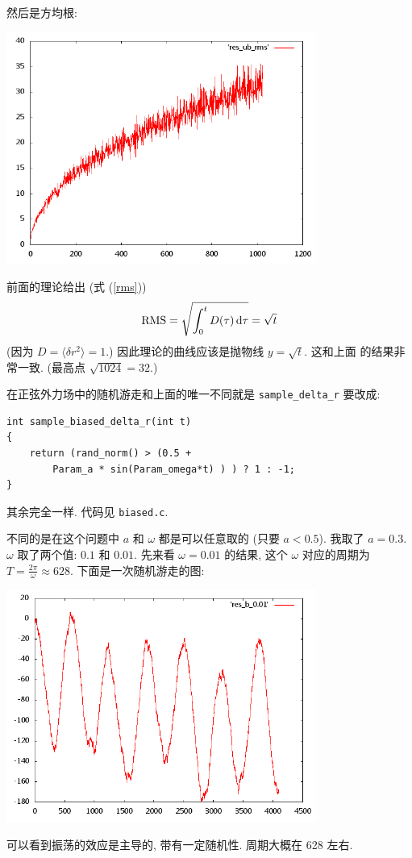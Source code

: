 \documentclass{ctexart}
\def\dd{{\rm d}}
\begin{document}
然后是方均根:
\begin{center}
\includegraphics[width=4in]{plot_ub_rms.png}
\end{center}
前面的理论给出 (式 (\ref{rms}))
\[
{\rm RMS} = \sqrt{\int^t_0 D(\tau)\,\dd\tau}
= \sqrt{t}
\]
(因为 $D = \langle \delta r^2\rangle = 1$.)
因此理论的曲线应该是抛物线 $y=\sqrt{t}$. 这和上面
的结果非常一致. (最高点 $\sqrt{1024}=32$.)

在正弦外力场中的随机游走和上面的唯一不同就是 \verb|sample_delta_r|
要改成:
\begin{verbatim}
int sample_biased_delta_r(int t)
{
    return (rand_norm() > (0.5 +
        Param_a * sin(Param_omega*t) ) ) ? 1 : -1;
}
\end{verbatim}
其余完全一样. 代码见 \verb|biased.c|.

不同的是在这个问题中 $a$ 和 $\omega$ 都是可以任意取的
(只要 $a<0.5$). 我取了 $a=0.3$. $\omega$ 取了两个值:
$0.1$ 和 $0.01$. 先来看 $\omega=0.01$ 的结果, 这个
$\omega$ 对应的周期为 $T=\frac{2\pi}{\omega}\approx
628$. 下面是一次随机游走的图:
\begin{center}
\includegraphics[width=4in]{plot_b_0.01.png}
\end{center}
可以看到振荡的效应是主导的, 带有一定随机性. 周期大概在 628
左右.
\end{document}
